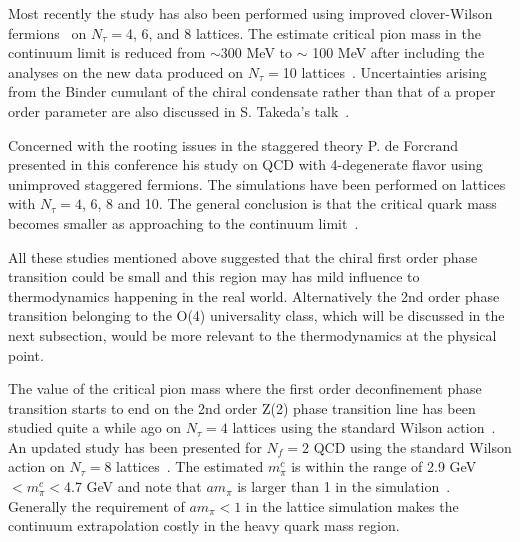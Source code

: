 \documentclass{PoS}
\begin{document}
Most recently the study has also been performed using improved clover-Wilson fermions~\cite{Jin:2014hea} on $N_\tau=$4, 6, and 8 lattices. The estimate critical pion mass in the continuum limit is 
reduced from $\sim 300$ MeV to $\sim$ 100 MeV after including the analyses on the new data produced on $N_\tau=$10 lattices~\cite{Takeda:2016vfj}. Uncertainties arising from the Binder cumulant of the chiral condensate rather than that of a proper order parameter are also discussed in S. Takeda's talk~\cite{Takeda:2016vfj}.


Concerned with the rooting issues in the staggered theory P. de Forcrand presented in this conference his study on QCD with 4-degenerate flavor
using unimproved staggered fermions. The simulations have been performed on lattices with $N_\tau=4$, 6, 8 and 10. The general conclusion is that the critical quark mass 
becomes smaller as approaching to the continuum limit~\cite{Forcrand2016}.
   
   
All these studies mentioned above suggested that the chiral first order phase transition could be small and this region may has mild influence to thermodynamics happening in the real world. Alternatively the 2nd order phase transition 
belonging to the O(4) universality class, which will be discussed in the next subsection, would be more relevant to the thermodynamics at the physical point.


   
   
 The value of the critical pion mass where the first order deconfinement phase transition starts to end on the 2nd order Z(2) phase transition line has been studied quite a while ago on $N_\tau=4$ lattices using the standard Wilson action~\cite{Saito:2011fs}. An updated study has been presented for $N_f=2$ QCD using the standard Wilson action on $N_\tau=8$ lattices~\cite{Czaban:2016yae}.
 The estimated $m_\pi^c$ is within the range of 2.9 GeV$< m_\pi^c <$4.7 GeV and note that $am_\pi$ is larger than 1 in the simulation~\cite{Czaban:2016yae}. Generally the requirement of $am_\pi <1$ in the lattice simulation makes the continuum extrapolation costly in the heavy quark mass region.  
 
 

\end{document}
